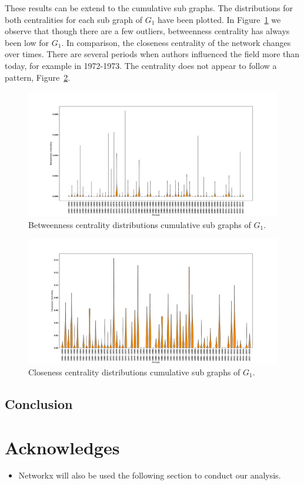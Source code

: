 \documentclass{article}
\theoremstyle{definition}
\begin{document}
These results can be extend to the cumulative sub graphs. The distributions for
both centralities for each sub graph of \(G_1\) have been plotted. In
Figure~\ref{fig:betweenness_dist_cumu} we observe that though there are a few outliers,
betweenness centrality has always been low for \(G_1\). In comparison, the
closeness centrality of the network changes over times. There are several
periods when authors influenced the field more than today, for example in 1972-1973.
The centrality does not appear to follow a pattern, Figure~\ref{fig:closeness_dist_cumu}.

\begin{figure}[!hbtp]
    \centering
    \includegraphics[width=\textwidth]{./assets/images/betweeness_over_time.pdf}
    \caption{Betweenness centrality distributions cumulative sub graphs of \(G_1\).}\label{fig:betweenness_dist_cumu}
\end{figure}

\begin{figure}[!hbtp]
    \centering
    \includegraphics[width=\textwidth]{./assets/images/closeness_over_time.pdf}
    \caption{Closeness centrality distributions cumulative sub graphs of \(G_1\).}\label{fig:closeness_dist_cumu}
\end{figure}

\subsection{Conclusion}

\section{Acknowledges}

\begin{itemize}
    \item Networkx will also be used the following section to conduct our analysis.
\end{itemize}

\newpage


\end{document}
